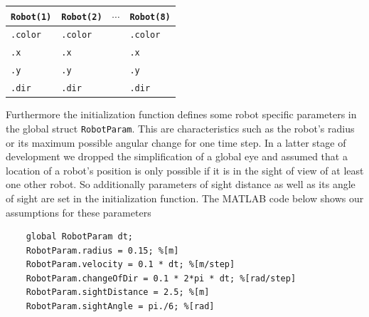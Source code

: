 \begin{center}
	\begin{tabular}{| l | l | c | l |} \hline
		\texttt{Robot(1)} & \texttt{Robot(2)} & $\cdots$ & \texttt{Robot(8)}  \\ \hline
		\texttt{.color} & \texttt{.color} & &\texttt{.color} \\
		\texttt{.x} & \texttt{.x} & & \texttt{.x} \\
		\texttt{.y} & \texttt{.y} & & \texttt{.y} \\
		\texttt{.dir} & \texttt{.dir} & & \texttt{.dir}\\ \hline
	\end{tabular}
\end{center}
 
Furthermore the initialization function defines some robot specific parameters in the global struct \texttt{RobotParam}. This are characteristics such as the robot's radius or its maximum possible angular change for one time step. In a latter stage of development we dropped the simplification of a global eye and assumed that a location of a robot's position is only possible if it is in the sight of view of at least one other robot. So additionally parameters of sight distance as well as its angle of sight are set in the initialization function. The MATLAB code below shows our assumptions for these parameters
\begin{lstlisting}
    global RobotParam dt;
    RobotParam.radius = 0.15; %[m]
    RobotParam.velocity = 0.1 * dt; %[m/step]
    RobotParam.changeOfDir = 0.1 * 2*pi * dt; %[rad/step]
    RobotParam.sightDistance = 2.5; %[m]
    RobotParam.sightAngle = pi./6; %[rad]
\end{lstlisting}
  
